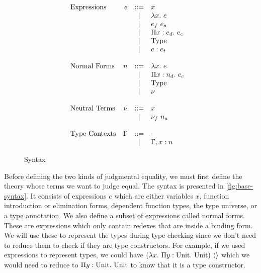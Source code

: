 \begin{figure}[!htb]
  \begin{displaymath}
    \begin{array}{lrcll}
      \text{Expressions} & e & \bnfdef & x & \bnfcomment{variables} \\
      & & \bnfalt & \lamE{x}{e} & \bnfcomment{function literal} \\
      & & \bnfalt & \appE{e_f}{e_a} & \bnfcomment{function application} \\
      & & \bnfalt & \piE{x}{e_d}{e_c} & \bnfcomment{dependent function type} \\
      & & \bnfalt & \univE & \bnfcomment{type universe} \\
      & & \bnfalt & \annE{e}{e_t} & \bnfcomment{type annotation} \\
      \\
      \text{Normal Forms} & n & \bnfdef & \lamE{x}{e} & \\
      & & \bnfalt & \piE{x}{n_d}{e_c} & \\
      & & \bnfalt & \univE & \\
      & & \bnfalt & \nu & \\
      \\
      \text{Neutral Terms} & \nu & \bnfdef & x & \\
      & & \bnfalt & \appE{\nu_f}{n_a} & \\
      \\
      \text{Type Contexts} & \Gamma & \bnfdef & \cdot & \\
      & & \bnfalt & \Gamma, x : n & \\
    \end{array}
  \end{displaymath}
  \caption{Syntax}
  \label{fig:base-syntax}
\end{figure}

Before defining the two kinds of judgmental equality, we must first define the theory whose terms we want to judge equal.
The syntax is presented in \autoref{fig:base-syntax}.
It consists of expressions $e$ which are either variables $x$, function introduction or elimination forms, dependent function types, the type universe, or a type annotation.
We also define a subset of expressions called normal forms.
These are expressions which only contain redexes that are inside a binding form.
We will use these to represent the types during type checking since we don't need to reduce them to check if they are type constructors.
For example, if we used expressions to represent types, we could have $\appE{(\lamE{x}{\piE{y}{\unittE}{\unittE}})}{\unitE}$ which we would need to reduce to $\piE{y}{\unittE}{\unittE}$ to know that it is a type constructor.

